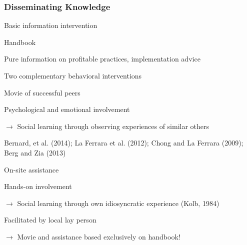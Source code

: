 \documentclass[hideothersubsections, usenames,dvipsnames,11pt]{beamer}
\newenvironment{itemize_2pt}{\itemize\addtolength{\itemsep}{2pt}}{\enditemize}
\begin{document}
\begin{frame}
\frametitle{Disseminating Knowledge}

Basic information intervention
	\begin{itemize_2pt}
		\item Handbook
		\begin{itemize_2pt}
			\item \textcolor{bdf}{Pure information} on profitable practices, implementation advice
		\end{itemize_2pt}
	\end{itemize_2pt}
	
	\vspace{1.0em}

Two complementary behavioral interventions
	\begin{itemize_2pt}
		\item Movie of successful peers
		\begin{itemize_2pt}
			\item \textcolor{bdf}{Psychological and emotional involvement}
			\item[] $\rightarrow$ Social learning through \textcolor{bdf}{observing experiences of similar others}
			\item \textcolor{camel}{Bernard, et al. (2014); La Ferrara et al. (2012); Chong and La Ferrara (2009); Berg and Zia (2013)}
		\end{itemize_2pt}

		\item On-site assistance
			\begin{itemize_2pt}
				\item \textcolor{bdf}{Hands-on involvement}
				\item[] $\rightarrow$ Social learning through own \textcolor{bdf}{idiosyncratic experience} \textcolor{camel}{(Kolb, 1984)}
				\item Facilitated by local lay person
			\end{itemize_2pt}
		\item[] $\rightarrow$ Movie and assistance based exclusively on handbook!

	\end{itemize_2pt}

\end{frame}
\end{document}
